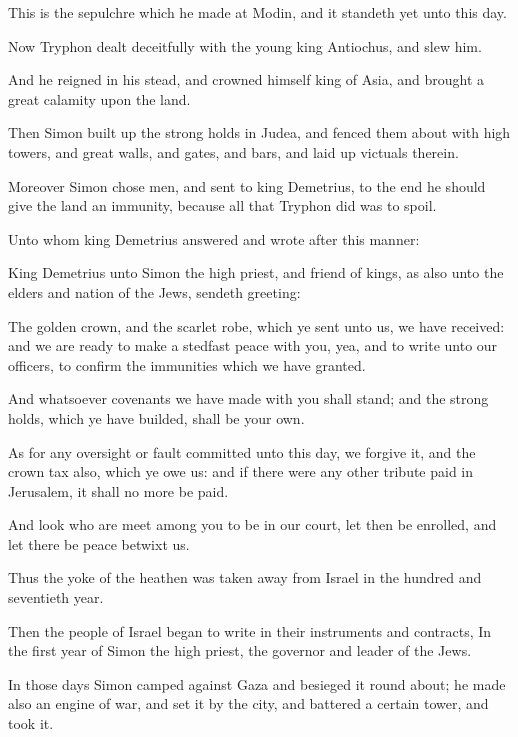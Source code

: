 {\par }{\PP {}This is the sepulchre which he made at Modin, and it standeth yet unto this day.
\par }{\PP {}Now Tryphon dealt deceitfully with the young king Antiochus, and slew him.
\par }{\PP {}And he reigned in his stead, and crowned himself king of Asia, and brought a great calamity upon the land.
\par }{\PP {}Then Simon built up the strong holds in Judea, and fenced them about with high towers, and great walls, and gates, and bars, and laid up victuals therein.
\par }{\PP {}Moreover Simon chose men, and sent to king Demetrius, to the end he should give the land an immunity, because all that Tryphon did was to spoil.
\par }{\PP {}Unto whom king Demetrius answered and wrote after this manner:
\par }{\PP {}King Demetrius unto Simon the high priest, and friend of kings, as also unto the elders and nation of the Jews, sendeth greeting:
\par }{\PP {}The golden crown, and the scarlet robe, which ye sent unto us, we have received: and we are ready to make a stedfast peace with you, yea, and to write unto our officers, to confirm the immunities which we have granted.
\par }{\PP {}And whatsoever covenants we have made with you shall stand; and the strong holds, which ye have builded, shall be your own.
\par }{\PP {}As for any oversight or fault committed unto this day, we forgive it, and the crown tax also, which ye owe us: and if there were any other tribute paid in Jerusalem, it shall no more be paid.
\par }{\PP {}And look who are meet among you to be in our court, let then be enrolled, and let there be peace betwixt us.
\par }{\PP {}Thus the yoke of the heathen was taken away from Israel in the hundred and seventieth year.
\par }{\PP {}Then the people of Israel began to write in their instruments and contracts, In the first year of Simon the high priest, the governor and leader of the Jews.
\par }{\PP {}In those days Simon camped against Gaza and besieged it round about; he made also an engine of war, and set it by the city, and battered a certain tower, and took it.
}
